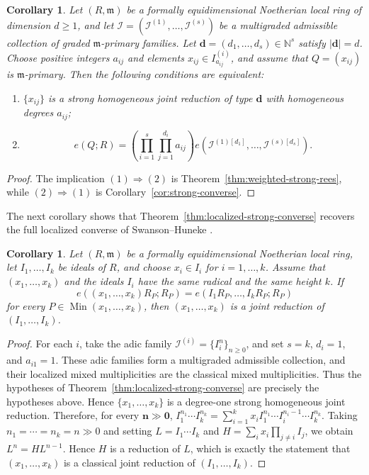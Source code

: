 \documentclass[reqno,12pt]{amsart}
\theoremstyle{plain}
\newtheorem{cor}[prop]{Corollary}
\theoremstyle{definition}
\theoremstyle{remark}
\numberwithin{equation}{section}
\begin{document}
\begin{cor}
\label{cor:numerical-characterization}
Let $(R,\mathfrak m)$ be a formally equidimensional Noetherian local ring
of dimension $d\geq1$, and let
$\boldsymbol{\mathcal I}
=(\mathcal I^{(1)},\ldots,\mathcal I^{(s)})$
be a multigraded admissible collection of graded
$\mathfrak m$-primary families. Let
$\mathbf d=(d_1,\ldots,d_s)\in\mathbb N^s$ satisfy $|\mathbf d|=d$.
Choose positive integers $a_{ij}$ and elements
$x_{ij}\in I_{a_{ij}}^{(i)}$, and assume that
$Q=(x_{ij})$ is $\mathfrak m$-primary. Then the following conditions are
equivalent:
\begin{enumerate}
\item $\{x_{ij}\}$ is a strong homogeneous joint reduction of type
$\mathbf d$ with homogeneous degrees $a_{ij}$;
\item
\[
e(Q;R)
=
\left(\prod_{i=1}^{s}\prod_{j=1}^{d_i}a_{ij}\right)
e\!\left(
\mathcal I^{(1)[d_1]},\ldots,
\mathcal I^{(s)[d_s]}
\right).
\]
\end{enumerate}
\end{cor}

\begin{proof}
The implication $(1)\Rightarrow(2)$ is
Theorem~\ref{thm:weighted-strong-rees}, while
$(2)\Rightarrow(1)$ is
Corollary~\ref{cor:strong-converse}.
\end{proof}

The next corollary shows that Theorem~\ref{thm:localized-strong-converse}
recovers the full localized converse of Swanson--Huneke
\cite[Theorem~17.6.1]{SwansonHuneke}.

\begin{cor}
\label{cor:swanson-full-specialization}
Let $(R,\mathfrak m)$ be a formally equidimensional Noetherian local
ring, let $I_1,\ldots,I_k$ be ideals of $R$, and choose
$x_i\in I_i$ for $i=1,\ldots,k$. Assume that
$(x_1,\ldots,x_k)$ and the ideals $I_i$ have the same radical and the
same height $k$. If
\[
e((x_1,\ldots,x_k)R_P;R_P)
=
e(I_1R_P,\ldots,I_kR_P;R_P)
\]
for every $P\in\operatorname{Min}(x_1,\ldots,x_k)$, then
$(x_1,\ldots,x_k)$ is a joint reduction of
$(I_1,\ldots,I_k)$.
\end{cor}

\begin{proof}
For each $i$, take the adic family
$\mathcal I^{(i)}=\{I_i^n\}_{n\geq0}$, and set
$s=k$, $d_i=1$, and $a_{i1}=1$. These adic families form a multigraded
admissible collection, and their localized mixed multiplicities are the
classical mixed multiplicities. Thus the hypotheses of
Theorem~\ref{thm:localized-strong-converse} are precisely the hypotheses
above. Hence $\{x_1,\ldots,x_k\}$ is a degree-one strong homogeneous
joint reduction. Therefore, for every $\mathbf n\gg\mathbf0$, $I_1^{n_1}\cdots I_k^{n_k}
=
\sum_{i=1}^{k}
x_iI_1^{n_1}\cdots I_i^{n_i-1}\cdots I_k^{n_k}.$
Taking $n_1=\cdots=n_k=n\gg0$ and setting
$L=I_1\cdots I_k$ and
$H=\sum_i x_i\prod_{j\neq i}I_j$, we obtain
$L^n=HL^{n-1}$. Hence $H$ is a reduction of $L$, which is exactly the
statement that $(x_1,\ldots,x_k)$ is a classical joint reduction of
$(I_1,\ldots,I_k)$.
\end{proof}
\end{document}
